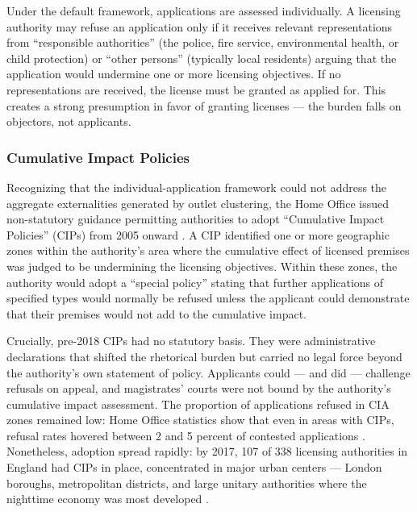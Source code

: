 \documentclass[12pt]{article}
\begin{document}
Under the default framework, applications are assessed individually. A licensing authority may refuse an application only if it receives relevant representations from ``responsible authorities'' (the police, fire service, environmental health, or child protection) or ``other persons'' (typically local residents) arguing that the application would undermine one or more licensing objectives. If no representations are received, the license must be granted as applied for. This creates a strong presumption in favor of granting licenses --- the burden falls on objectors, not applicants.

\subsubsection*{Cumulative Impact Policies} Recognizing that the individual-application framework could not address the aggregate externalities generated by outlet clustering, the Home Office issued non-statutory guidance permitting authorities to adopt ``Cumulative Impact Policies'' (CIPs) from 2005 onward \citep{homeoffice2018guidance}. A CIP identified one or more geographic zones within the authority's area where the cumulative effect of licensed premises was judged to be undermining the licensing objectives. Within these zones, the authority would adopt a ``special policy'' stating that further applications of specified types would normally be refused unless the applicant could demonstrate that their premises would not add to the cumulative impact.

Crucially, pre-2018 CIPs had no statutory basis. They were administrative declarations that shifted the rhetorical burden but carried no legal force beyond the authority's own statement of policy. Applicants could --- and did --- challenge refusals on appeal, and magistrates' courts were not bound by the authority's cumulative impact assessment. The proportion of applications refused in CIA zones remained low: Home Office statistics show that even in areas with CIPs, refusal rates hovered between 2 and 5 percent of contested applications \citep{homeoffice2020licensing}. Nonetheless, adoption spread rapidly: by 2017, 107 of 338 licensing authorities in England had CIPs in place, concentrated in major urban centers --- London boroughs, metropolitan districts, and large unitary authorities where the nighttime economy was most developed \citep{grace2016cumulative}.
\end{document}
